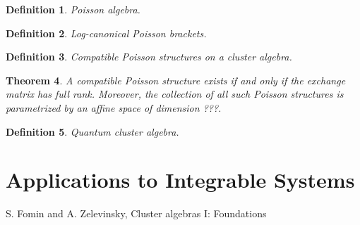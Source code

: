 \documentclass{amsart}
\newtheorem{theorem}{Theorem}[section]
\newtheorem{definition}[theorem]{Definition}
\theoremstyle{remark}
\numberwithin{equation}{section}
\begin{document}
  \begin{definition}
    Poisson algebra.
  \end{definition}

  \begin{definition}
    Log-canonical Poisson brackets.
  \end{definition}

  \begin{definition}
    Compatible Poisson structures on a cluster algebra.
  \end{definition}

  \begin{theorem}
    A compatible Poisson structure exists if and only if the exchange matrix has full rank.  Moreover, the collection of all such Poisson structures is parametrized by an affine space of dimension ???.
  \end{theorem}

  \begin{definition}
    Quantum cluster algebra.
  \end{definition}

\section{Applications to Integrable Systems}


\begin{thebibliography}{99}
  \bibitem[FZ02] S. Fomin and A. Zelevinsky, Cluster algebras I: Foundations
\end{thebibliography}
\end{document}
